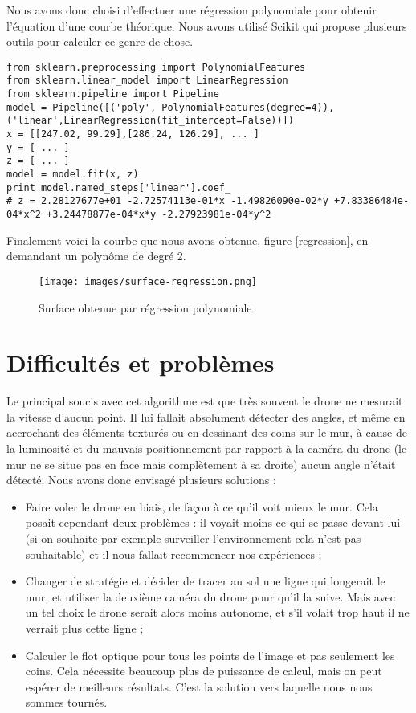 \documentclass[titlepage,11pt,a4paper]{article}
\begin{document}
Nous avons donc choisi d'effectuer une régression polynomiale pour obtenir l'équation d'une courbe \og{}théorique\fg{}. Nous avons utilisé Scikit qui propose plusieurs outils pour calculer ce genre de chose. 

\begin{lstlisting}
from sklearn.preprocessing import PolynomialFeatures
from sklearn.linear_model import LinearRegression
from sklearn.pipeline import Pipeline
model = Pipeline([('poly', PolynomialFeatures(degree=4)), ('linear',LinearRegression(fit_intercept=False))])
x = [[247.02, 99.29],[286.24, 126.29], ... ]
y = [ ... ]
z = [ ... ]
model = model.fit(x, z)
print model.named_steps['linear'].coef_
# z = 2.28127677e+01 -2.72574113e-01*x -1.49826090e-02*y +7.83386484e-04*x^2 +3.24478877e-04*x*y -2.27923981e-04*y^2
\end{lstlisting}

Finalement voici la courbe que nous avons obtenue, figure \vref{regression}, en demandant un polynôme de degré 2.

\begin{figure}
	\caption{\label{regression} Surface obtenue par régression polynomiale}
	\texttt{[image: images/surface-regression.png]}
\end{figure}


\section{Difficultés et problèmes}
Le principal soucis avec cet algorithme est que très souvent le drone ne mesurait la vitesse d'aucun point. Il lui fallait absolument détecter des angles, et même en accrochant des éléments texturés ou en dessinant des coins sur le mur, à cause de la luminosité et du mauvais positionnement par rapport à la caméra du drone (le mur ne se situe pas en face mais complètement à sa droite) aucun angle n'était détecté. Nous avons donc envisagé plusieurs solutions :
\begin{itemize}
	\item Faire voler le drone en biais, de façon à ce qu'il voit mieux le mur. Cela posait cependant deux problèmes : il voyait moins ce qui se passe devant lui (si on souhaite par exemple surveiller l'environnement cela n'est pas souhaitable) et il nous fallait recommencer nos expériences ;
	\item Changer de stratégie et décider de tracer au sol une ligne qui longerait le mur, et utiliser la deuxième caméra du drone pour qu'il la suive. Mais avec un tel choix le drone serait alors moins autonome, et s'il volait trop haut il ne verrait plus cette ligne ;
	\item Calculer le flot optique pour tous les points de l'image et pas seulement les coins. Cela nécessite beaucoup plus de puissance de calcul, mais on peut espérer de meilleurs résultats. C'est la solution vers laquelle nous nous sommes tournés.
\end{itemize}
\end{document}
